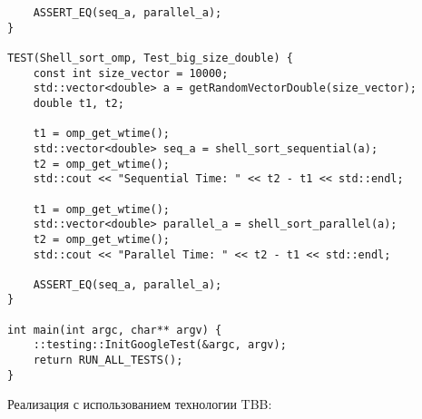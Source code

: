 \documentclass{report}
\begin{document}
\begin{lstlisting}
    ASSERT_EQ(seq_a, parallel_a);
}

TEST(Shell_sort_omp, Test_big_size_double) {
    const int size_vector = 10000;
    std::vector<double> a = getRandomVectorDouble(size_vector);
    double t1, t2;

    t1 = omp_get_wtime();
    std::vector<double> seq_a = shell_sort_sequential(a);
    t2 = omp_get_wtime();
    std::cout << "Sequential Time: " << t2 - t1 << std::endl;

    t1 = omp_get_wtime();
    std::vector<double> parallel_a = shell_sort_parallel(a);
    t2 = omp_get_wtime();
    std::cout << "Parallel Time: " << t2 - t1 << std::endl;

    ASSERT_EQ(seq_a, parallel_a);
}

int main(int argc, char** argv) {
    ::testing::InitGoogleTest(&argc, argv);
    return RUN_ALL_TESTS();
}

\end{lstlisting}

\par Реализация с использованием технологии TBB:
\end{document}
